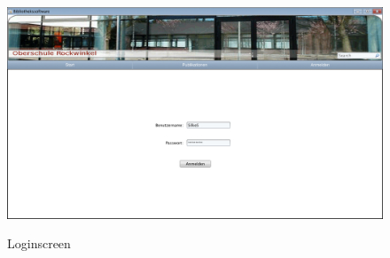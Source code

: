 \documentclass[fontsize=12pt,paper=a4,twoside]{scrartcl}
\begin{document}
\begin{figure}[htbp]
\caption{Loginscreen}
\includegraphics[width=1\textwidth]{ScreensWebsite/LoginSchueler.png}
  \label{login}
\end{figure}
\end{document}
